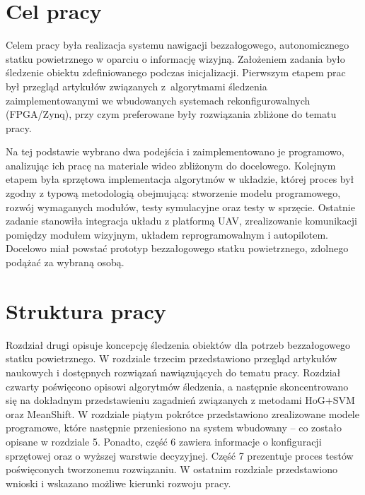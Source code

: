\section{Cel pracy}

Celem pracy była realizacja systemu nawigacji bezzałogowego, autonomicznego statku powietrznego w oparciu o informację wizyjną. 
Założeniem zadania było śledzenie obiektu zdefiniowanego podczas inicjalizacji. 
Pierwszym etapem prac był przegląd artykułów związanych z~algorytmami śledzenia 
zaimplementowanymi we wbudowanych systemach rekonfigurowalnych 
(FPGA/Zynq), przy czym preferowane były rozwiązania zbliżone do tematu pracy. 

Na tej podstawie wybrano dwa podejścia i zaimplementowano je programowo, analizując ich pracę na materiale wideo zbliżonym do docelowego. 
Kolejnym etapem była sprzętowa implementacja algorytmów w układzie, której proces był zgodny z typową metodologią obejmującą: stworzenie modelu programowego, rozwój wymaganych modułów, testy symulacyjne oraz testy w sprzęcie.
Ostatnie zadanie stanowiła integracja układu z platformą UAV, zrealizowanie komunikacji pomiędzy modułem wizyjnym, układem reprogramowalnym i autopilotem. 
Docelowo miał powstać prototyp bezzałogowego statku powietrznego, zdolnego podążać za wybraną osobą.





\section{Struktura pracy}

Rozdział drugi opisuje koncepcję śledzenia obiektów dla potrzeb bezzałogowego statku powietrznego.
W rozdziale trzecim przedstawiono przegląd artykułów naukowych i dostępnych rozwiązań nawiązujących do tematu pracy.
Rozdział czwarty poświęcono opisowi algorytmów śledzenia, a następnie skoncentrowano się na dokładnym przedstawieniu zagadnień związanych z metodami HoG+SVM oraz MeanShift. 
W rozdziale piątym pokrótce przedstawiono zrealizowane modele programowe, które następnie przeniesiono na system wbudowany -- co zostało opisane w rozdziale 5.
Ponadto, część 6 zawiera informacje o konfiguracji sprzętowej oraz o wyższej warstwie decyzyjnej. 
Część 7 prezentuje proces testów poświęconych tworzonemu rozwiązaniu. 
W ostatnim rozdziale przedstawiono wnioski i wskazano możliwe kierunki rozwoju pracy.












